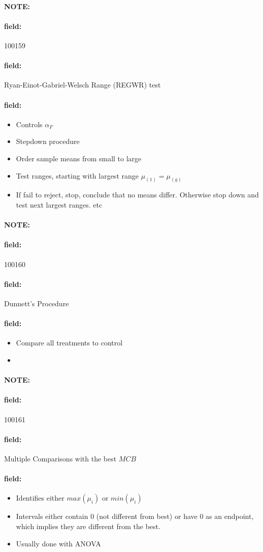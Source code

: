 \documentclass[12pt]{article}
\newenvironment{note}{\paragraph{NOTE:}}{}
\newenvironment{field}{\paragraph{field:}}{}
\begin{document}
\begin{note}
 \begin{field}
  \tiny 100159
 \end{field}
 \begin{field}
  Ryan-Einot-Gabriel-Welsch Range (REGWR) test
 \end{field}
 \begin{field}
  \begin{itemize}
   \item Controls $\alpha_F$
   \item Stepdown procedure
   \item Order sample means from small to large
   \item Test ranges, starting with largest range $\mu_{(1)} = \mu_{(g)}$
   \item If fail to reject, stop, conclude that no means differ. Otherwise stop down and test next largest ranges. etc
  \end{itemize}
 \end{field}
\end{note}

\begin{note}
 \begin{field}
  \tiny 100160
 \end{field}
 \begin{field}
  Dunnett's Procedure
 \end{field}
 \begin{field}
  \begin{itemize}
   \item Compare all treatments to control
   \item
  \end{itemize}
 \end{field}
\end{note}

\begin{note}
 \begin{field}
  \tiny 100161
 \end{field}
 \begin{field}
  Multiple Comparisons with the best $MCB$
 \end{field}
 \begin{field}
  \begin{itemize}
   \item Identifies either $max(\mu_i)$ or $min(\mu_i)$
   \item Intervals either contain 0 (not different from best) or have 0 as an endpoint, which implies they are different from the best.
   \item Usually done with ANOVA
  \end{itemize}
 \end{field}
\end{note}
\end{document}
